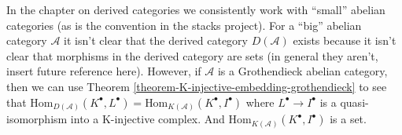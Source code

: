 \begin{remark}
\label{remark-existence-D}
In the chapter on derived categories we consistently work with
``small'' abelian categories (as is the convention in the stacks
project). For a ``big'' abelian category $\mathcal{A}$ it isn't clear
that the derived category $D(\mathcal{A})$ exists because it isn't
clear that morphisms in the derived category are sets (in general they
aren't, insert future reference here). However, if
$\mathcal{A}$ is a Grothendieck abelian category, then we can use
Theorem \ref{theorem-K-injective-embedding-grothendieck}
to see that
$\text{Hom}_{D(\mathcal{A})}(K^\bullet, L^\bullet) =
\text{Hom}_{K(\mathcal{A})}(K^\bullet, I^\bullet)$
where $L^\bullet \to I^\bullet$ is a quasi-isomorphism into a
K-injective complex. And $\text{Hom}_{K(\mathcal{A})}(K^\bullet, I^\bullet)$
is a set.
\end{remark}











